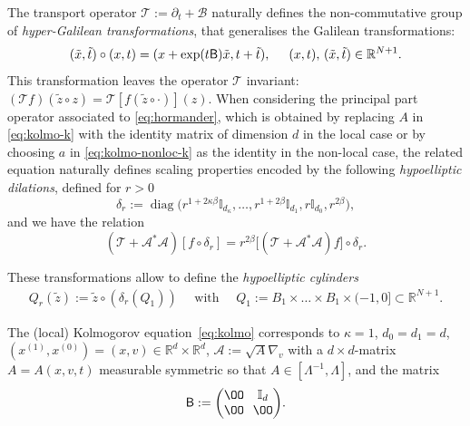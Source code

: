 \documentclass[JEP,XML,SOM,Unicode,NoFloatCountersInSection,published]{cedram}
\DeclareMathOperator{\diag}{diag}
\theoremstyle{definition}
\newcommand\R{{\mathbb R}}
\newcommand{\cA}{{\mathcal A}}
\newcommand{\cB}{{\mathcal B}}
\newcommand{\cT}{{\mathcal T}}
\newcommand{\sB}{{\mathsf B}}
\begin{document}
The transport operator $\mathcal T := \partial_t + \cB$
naturally defines the non-commutative group of
\emph{hyper-Galilean transformations}, that generalises the
Galilean transformations:
\begin{equation}
\label{grouplaw}
(\tilde x,\tilde t) \circ (x, t) = (x + \exp(t \sB) \tilde x,
t+ \tilde t),
\hspace{5mm} (x,t), \, (\tilde x, \tilde t) \in \R^{N+1}.
\end{equation}
This transformation leaves the operator $\mathcal T$ invariant:
$(\mathcal T f)(\tilde z \circ z) = \mathcal T[f(\tilde z \circ
\cdot)](z)$.
When considering the principal part operator associated to \eqref{eq:hormander}, which is obtained by replacing $A$ in \eqref{eq:kolmo-k} with the identity matrix of dimension $d$ in the local case or by choosing $a$ in \eqref{eq:kolmo-nonloc-k} as the identity in the non-local case, the related equation naturally
defines scaling properties encoded by the following \emph{hypoelliptic dilations}, defined for $r >0$
\begin{equation}
\label{e-dilations}
\delta_r :=\diag\bigl(r^{1+2\kappa \beta}
\mathbb{I}_{d_\kappa}, \dots,r^{1+
2\beta}\mathbb{I}_{d_1},r \mathbb{I}_{d_0},r^{2\beta}\bigr),
\end{equation}
and we have the relation
\begin{equation*}
(\cT + \cA^* \cA)[f\circ \delta_r] = r^{2\beta}
\big[\left(\cT + \cA^* \cA \right)f\big] \circ \delta_r.
\end{equation*}

These transformations allow to define the \emph{hypoelliptic
cylinders}
\begin{eqnarray*}
\label{rcylind}
Q_r(\tilde z):=\tilde z
\circ\left(\delta_r\left(Q_1\right)\right) \quad \text{ with }
\quad Q_1:=B_1 \times \ldots \times
B_1 \times (-1,0] \subset \R^{N+1}.
\end{eqnarray*}

The (local) Kolmogorov equation~\eqref{eq:kolmo} corresponds to
$\kappa=1$, $d_0=d_1=d$,
$(x^{(1)},x^{(0)})=(x,v) \in \R^d \times \R^d$,
$\cA:=\sqrt{A} \nabla_v $ with a $d \times d$-matrix
$A=A(x,v,t)$ measurable symmetric so that
$A \in [\Lambda^{-1},\Lambda]$, and the matrix
\begin{equation}
\label{eq:matrixB1}\arraycolsep3.5pt
\sB := \begin{pmatrix}
\OO & \mathbb{I}_d \\
\OO & \OO
\end{pmatrix}\!.
\end{equation}
\end{document}
